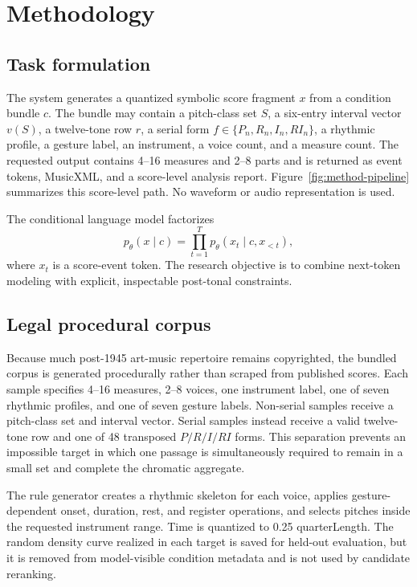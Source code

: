 \section{Methodology}
\label{sec:method}

\subsection{Task formulation}

The system generates a quantized symbolic score fragment $x$ from a condition bundle $c$. The bundle may contain a pitch-class set $S$, a six-entry interval vector $v(S)$, a twelve-tone row $r$, a serial form $f\in\{P_n,R_n,I_n,RI_n\}$, a rhythmic profile, a gesture label, an instrument, a voice count, and a measure count. The requested output contains 4--16 measures and 2--8 parts and is returned as event tokens, MusicXML, and a score-level analysis report. Figure~\ref{fig:method-pipeline} summarizes this score-level path. No waveform or audio representation is used.

The conditional language model factorizes
\begin{equation}
  p_\theta(x\mid c)=\prod_{t=1}^{T}p_\theta(x_t\mid c,x_{<t}),
  \label{eq:conditional-lm}
\end{equation}
where $x_t$ is a score-event token. The research objective is to combine next-token modeling with explicit, inspectable post-tonal constraints.

\subsection{Legal procedural corpus}

Because much post-1945 art-music repertoire remains copyrighted, the bundled corpus is generated procedurally rather than scraped from published scores. Each sample specifies 4--16 measures, 2--8 voices, one instrument label, one of seven rhythmic profiles, and one of seven gesture labels. Non-serial samples receive a pitch-class set and interval vector. Serial samples instead receive a valid twelve-tone row and one of 48 transposed $P/R/I/RI$ forms. This separation prevents an impossible target in which one passage is simultaneously required to remain in a small set and complete the chromatic aggregate.

The rule generator creates a rhythmic skeleton for each voice, applies gesture-dependent onset, duration, rest, and register operations, and selects pitches inside the requested instrument range. Time is quantized to 0.25 quarterLength. The random density curve realized in each target is saved for held-out evaluation, but it is removed from model-visible condition metadata and is not used by candidate reranking.

